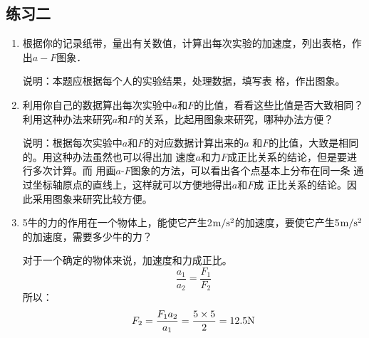 \subsection{练习二}
\begin{enumerate}
	\item 根据你的记录纸带，量出有关数值，计算出每次实验的加速度，列出表格，作出$a-F$图象．
	 
    \begin{solution}
        说明：本题应根据每个人的实验结果，处理数据，填写表
        格，作出图象。
    \end{solution}
	\item 利用你自己的数据算出每次实验中$a$和$F$的比值，看看这些比值是否大致相同？利用这种办法来研究$a$和$F$的关系，比起用图象来研究，哪种办法方便？
	 
    \begin{solution}
        说明：根据每次实验中$a$和$F$的对应数据计算出来的$a$
        和$F$的比值，大致是相同的。用这种办法虽然也可以得出加
        速度$a$和力$F$成正比关系的结论，但是要进行多次计算。而
        用画$a$-$F$图象的方法，可以看出各个点基本上分布在同一条
        通过坐标轴原点的直线上，这样就可以方便地得出$a$和$F$成
        正比关系的结论。因此采用图象来研究比较方便。  
    \end{solution}
	\item 5牛的力的作用在一个物体上，能使它产生2$\text{m}/\text{s}^2$的加速度，要使它产生5$\text{m}/\text{s}^2$的加速度，需要多少牛的力？
	 
    \begin{solution}
对于一个确定的物体来说，加速度和力成正比。  
\[\frac{a_1}{a_2}=\frac{F_1}{F_2}\]
所以：
\[F_2=\frac{F_1a_2}{a_1}=\frac{5\times5}{2}=12.5{\rm N}\]      
    \end{solution}
\end{enumerate}



